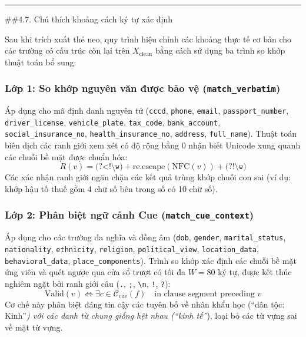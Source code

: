 \documentclass[
  11pt,
  a4paper,
]{article}
\begin{document}
\begin{center}\rule{0.5\linewidth}{0.5pt}\end{center}

\#\#4.7. Chú thích khoảng cách ký tự xác định

Sau khi trích xuất thẻ neo, quy trình hiệu chỉnh các khoảng thực tế cơ
bản cho các trường có cấu trúc còn lại trên \(X_{\text{clean}}\) bằng
cách sử dụng ba trình so khớp thuật toán bổ sung:

\subsubsection{\texorpdfstring{Lớp 1: So khớp nguyên văn được bảo vệ
(\texttt{match\_verbatim})}{Lớp 1: So khớp nguyên văn được bảo vệ (match\_verbatim)}}\label{lux1edbp-1-so-khux1edbp-nguyuxean-vux103n-ux111ux1b0ux1ee3c-bux1ea3o-vux1ec7-match_verbatim}

Áp dụng cho mã định danh nguyên tử (\texttt{cccd}, \texttt{phone},
\texttt{email}, \texttt{passport\_number}, \texttt{driver\_license},
\texttt{vehicle\_plate}, \texttt{tax\_code}, \texttt{bank\_account},
\texttt{social\_insurance\_no}, \texttt{health\_insurance\_no},
\texttt{address}, \texttt{full\_name}). Thuật toán biên dịch các ranh
giới xem xét có độ rộng bằng 0 nhận biết Unicode xung quanh các chuỗi bề
mặt được chuẩn hóa:
\[R(v) = \texttt{(?<!\textbackslash{}w)} + \text{re.escape}(\text{NFC}(v)) + \texttt{(?!\textbackslash{}w)}\]
Các xác nhận ranh giới ngăn chặn các kết quả trùng khớp chuỗi con sai
(ví dụ: khớp hậu tố thuế gồm 4 chữ số bên trong số có 10 chữ số).

\subsubsection{\texorpdfstring{Lớp 2: Phân biệt ngữ cảnh Cue
(\texttt{match\_cue\_context})}{Lớp 2: Phân biệt ngữ cảnh Cue (match\_cue\_context)}}\label{lux1edbp-2-phuxe2n-biux1ec7t-ngux1eef-cux1ea3nh-cue-match_cue_context}

Áp dụng cho các trường đa nghĩa và đồng âm (\texttt{dob},
\texttt{gender}, \texttt{marital\_status}, \texttt{nationality},
\texttt{ethnicity}, \texttt{religion}, \texttt{political\_view},
\texttt{location\_data}, \texttt{behavioral\_data},
\texttt{place\_components}). Trình so khớp xác định các chuỗi bề mặt ứng
viên và quét ngược qua cửa sổ trượt có tối đa \(W = 80\) ký tự, được kết
thúc nghiêm ngặt bởi ranh giới câu (\texttt{.}, \texttt{;},
\texttt{\textbackslash{}n}, \texttt{!}, \texttt{?}):
\[\text{Valid}(v) \Longleftrightarrow \exists c \in \mathcal{C}_{\text{cue}}(f) \quad \text{in clause segment preceding } v\]
Cơ chế này phân biệt đáng tin cậy các tuyên bố về nhân khẩu học (``dân
tộc: Kinh''\emph{) với các danh từ chung giống hệt nhau (``kinh tế''}),
loại bỏ các từ vựng sai về mặt từ vựng.
\end{document}
